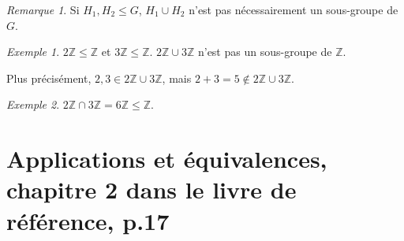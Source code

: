 \documentclass{report}
\newcommand*{\lte}{\leqslant}
\newcommand*{\entiers}{\mathbb{Z}}
\theoremstyle{definition}
\theoremstyle{remark}
\newtheorem*{exem}{Exemple}
\newtheorem*{rema}{Remarque}
\begin{document}
	\begin{rema}
		Si $H_1,H_2 \lte G$, $H_1 \cup H_2$ n'est pas n\'ecessairement un sous-groupe de $G$.
		\begin{exem}
			$2\entiers \lte \entiers$ et $3\entiers \lte \entiers$. $2\entiers \cup 3\entiers$ n'est pas un sous-groupe de $\entiers$.

			Plus pr\'ecis\'ement, $2,3 \in 2\entiers \cup 3\entiers$, mais $2+3=5 \not\in 2\entiers \cup 3\entiers$.
		\end{exem}
	\end{rema}
	\begin{exem}
		$2\entiers \cap 3\entiers = 6\entiers \lte \entiers$.
	\end{exem}

	\chapter[Applications et \'equivalences]{Applications et \'equivalences, chapitre 2 dans le livre de r\'ef\'erence, p.17}
\end{document}
